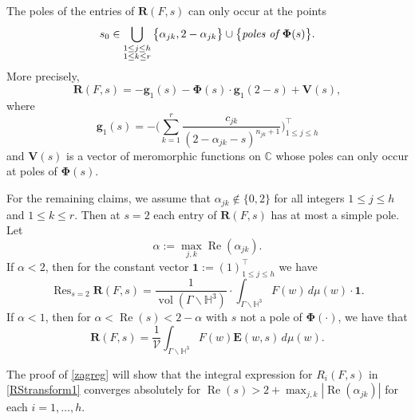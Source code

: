 \documentclass[12pt,reqno]{amsart}
\numberwithin{equation}{section}
\renewcommand{\Re}{\operatorname{Re}}
\DeclareMathOperator*{\Res}{Res}
\DeclareMathOperator{\vol}{vol}
\begin{document}
\begin{prop}
    The poles of the entries of $\boldsymbol{R}(F,s)$ can only occur at the points
    \begin{equation} \label{possiblepoles}
        s_0 \in  \bigcup_{\substack{1 \leq j  \leq h \\ 1 \leq k \leq r }}  \big\{\alpha_{jk}, 2-\alpha_{jk} \big\} \cup \big\{\emph{poles of }\boldsymbol{\Phi}(s) \big\} .
    \end{equation}
    More precisely,
    \begin{equation} \label{Rstarexp}
        \boldsymbol{R}(F,s)= - \boldsymbol{g}_1(s) - \boldsymbol{\Phi}(s) \cdot \boldsymbol{g}_1(2-s)  + \boldsymbol{V}(s),
    \end{equation}
    where
    \begin{equation} \label{hdef}
        \boldsymbol{g}_1(s) =-\Big({ \sum_{k=1}^{r} \frac{c_{jk}}{(2-\alpha_{jk}-s)^{n_{jk}+1}} }\Big )^{\top}_{1 \leq j \leq h}
    \end{equation}
    and $\boldsymbol{V}(s)$ is a vector of meromorphic functions on $\mathbb{C}$ whose poles can only occur at poles of $\boldsymbol{\Phi}(s)$.
    
    For the remaining claims, we assume that $\alpha_{jk} \not \in \{0,2\}$ for all integers $1 \leq j \leq h$ and $1 \leq k \leq r$. Then
   at $s=2$ each entry of $\boldsymbol{R}(F,s)$ has at most a simple pole. Let
     \begin{equation*} 
        \alpha:=\max_{j,k} \Re(\alpha_{jk}).
    \end{equation*}
    If $\alpha<2$, then for the constant vector $\boldsymbol{1} := (1)^{\top}_{1\leq j\leq h}$ we have
    \begin{equation} \label{Rstares2}
        \Res_{s=2} \boldsymbol{R}(F,s)=\frac{1}{\vol(\Gamma \backslash \mathbb{H}^3)} \cdot \int_{\Gamma \backslash \mathbb{H}^3} F(w)\, d \mu(w) \cdot \boldsymbol{1}.
    \end{equation}
    If $\alpha<1$, then for $\alpha<\Re(s)<2-\alpha$ with $s$ not a pole of $\boldsymbol{\Phi}(\cdot)$, we have that
    \begin{equation} \label{RSidentity}
        \boldsymbol{R}(F,s)= \frac{1}{\mathcal{V}}\int_{\Gamma \backslash \mathbb{H}^3} F(w) \boldsymbol{E}(w,s) \, d\mu(w).
    \end{equation}
\end{prop}

\begin{remark} \label{absconvrem}
    The proof of \cref{zagreg} will show that the integral expression for $R_{i}(F,s)$ in \eqref{RStransform1} converges absolutely for $\Re(s) > 2 + \max_{j,k} \left|\Re(\alpha_{jk})\right|$
    for each $i=1,\ldots,h$.
\end{remark}
\end{document}
